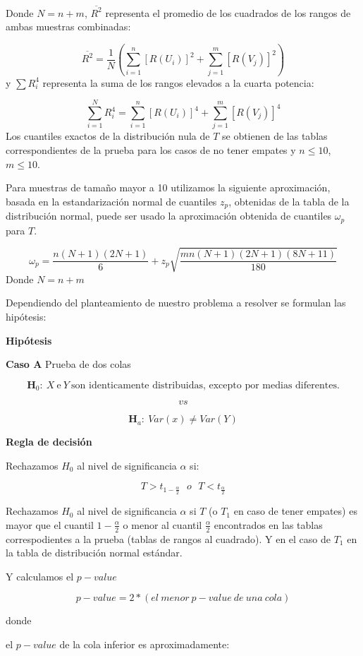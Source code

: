 \documentclass[
  a4paper,
  oneside,
  openany]{book}
\begin{document}
Donde \(N= n+m\), \(\overline{R^2}\) representa el promedio de los cuadrados de los rangos de ambas muestras combinadas:

\[\overline{R^2}= \frac{1}{N}\left(\sum_{i=1}^{n}[R(U_{i})]^2+\sum_{j=1}^{m}[R(V_{j})]^2\right)\]
y \(\sum R_{i}^4\) representa la suma de los rangos elevados a la cuarta potencia:

\[ \sum_{i=1}^{N}R_{i}^4= \sum_{i=1}^{n}[R(U_{i})]^4+\sum_{j=1}^{m}[R(V_{j})]^4\]
Los cuantiles exactos de la distribución nula de \(T\) se obtienen de las tablas correspondientes de la prueba para los casos de no tener empates y \(n \leq 10\), \(m \leq 10\).

Para muestras de tamaño mayor a 10 utilizamos la siguiente aproximación, basada en la estandarización normal de cuantiles \(z_p\), obtenidas de la tabla de la distribución normal, puede ser usado la aproximación obtenida de cuantiles \(\omega_p\) para \(T\).

\[\omega_p= \frac{n(N+1)(2N+1)}{6}+z_{p}\sqrt{\frac{mn(N+1)(2N+1)(8N+11)}{180}}\]
Donde \(N= n+m\)

Dependiendo del planteamiento de nuestro problema a resolver se formulan las hipótesis:

\textbf{Hipótesis}

\textbf{Caso A} Prueba de dos colas

\[\textbf{H}_0: \ X \ \mbox{e} \  Y \ \mbox{son identicamente distribuidas, excepto por medias diferentes.}\]

\[vs\]

\[\textbf{H}_a: \ Var(x) \neq  Var(Y)\]

\textbf{Regla de decisión}

Rechazamos \(H_0\) al nivel de significancia \(\alpha\) si:

\[T>t_{1-\frac{\alpha}{2}} \ \ \   o \ \ \  T<t_{\frac{\alpha}{2}}\]

Rechazamos \(H_0\) al nivel de significancia \(\alpha\) si \(T\) (o \(T_1\) en caso de tener empates) es mayor que el cuantil \(1-\frac{\alpha}{2}\) o menor al cuantil \(\frac{\alpha}{2}\) encontrados en las tablas correspodientes a la prueba (tablas de rangos al cuadrado). Y en el caso de \(T_{1}\) en la tabla de distribución normal estándar.

Y calculamos el \(p-value\)

\[p-value= 2*(el \ menor\ p-value\ de\ una\ cola)\]

donde

el \(p-value\) de la cola inferior es aproximadamente:
\end{document}
